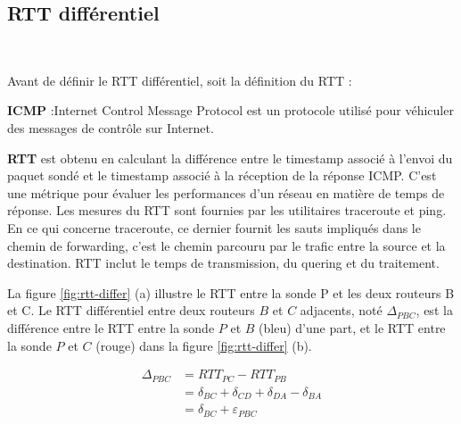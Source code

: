 \subsection{RTT différentiel }~

Avant de définir le RTT différentiel, soit la définition du RTT :


\begin{tcolorbox}
	
	\textbf{ICMP} :Internet Control Message Protocol est un protocole utilisé pour véhiculer des messages de contrôle sur Internet.
	
	\textbf{RTT} est obtenu en calculant la différence entre le timestamp associé à l'envoi du paquet sondé  et le timestamp associé à la réception de la réponse ICMP. C'est une métrique pour évaluer les performances d'un réseau en matière de temps de réponse. Les mesures du RTT sont fournies par les utilitaires traceroute et ping. En ce qui concerne traceroute,  ce dernier fournit les sauts impliqués dans le  chemin de forwarding, c'est le chemin parcouru par le trafic entre la source et la destination.  RTT inclut le temps de transmission, du quering et  du traitement. 
\end{tcolorbox}

La figure 	\ref{fig:rtt-differ} (a)  illustre le RTT entre la sonde P et les deux routeurs B et C. Le RTT différentiel  entre deux routeurs $B$ et $C$ adjacents, noté $\Delta_{PBC}$, est la différence entre le RTT entre la sonde $P$ et $B$ (bleu) d'une part, et le RTT entre la sonde $P$ et $C$ (rouge) dans la figure 	\ref{fig:rtt-differ} (b). 

\begin{align*}
\Delta_{PBC} &= RTT_{PC} - RTT_{PB} \\
&= \delta_{BC} + \delta_{CD} + \delta_{DA}  - \delta_{BA} \\
&= \delta_{BC} + \varepsilon_{PBC}
\end{align*}

